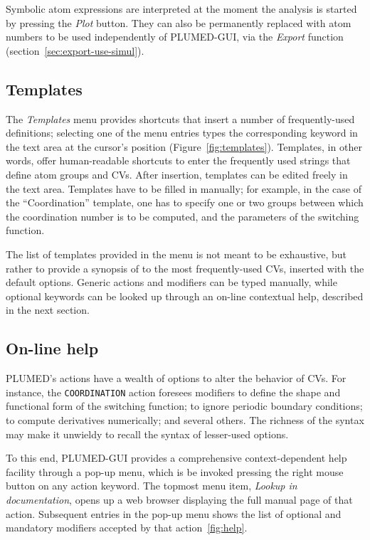 \documentclass[preprint,review,11pt]{elsarticle}
\begin{document}
Symbolic atom expressions are interpreted at the moment the analysis is
started by pressing the \emph{Plot} button. They can also be
permanently replaced with atom numbers to be used independently of PLUMED-GUI, via the
\emph{Export} function (section~\ref{sec:export-use-simul}).



\subsection{Templates}

The \emph{Templates} menu provides shortcuts that insert a number of
frequently-used definitions; selecting one of the menu entries types
the corresponding keyword in the text area at the cursor's position
(Figure~\ref{fig:templates}). Templates, in other words, offer
human-readable shortcuts to enter the frequently used strings that
define atom groups and CVs. After insertion, templates can be edited
freely in the text area.
Templates have to be filled in  manually; for example, in the
case of the ``Coordination'' template, one has to specify one or two
groups between which the coordination number is to be computed, and
the parameters of the switching function.

The list of templates provided in the menu is not meant to be
exhaustive, but rather to provide a synopsis of to the most
frequently-used CVs, inserted with the default options. Generic
actions and modifiers can be typed manually, while optional keywords
can be looked up through an on-line contextual help, described
in the next section.


\subsection{On-line help}

PLUMED's actions have a wealth of options to alter the
behavior of CVs. For instance, the \texttt{COORDINATION} action
foresees modifiers to define the shape and functional form of the
switching function; to ignore periodic boundary conditions; to compute
derivatives numerically; and several others. The richness of the
syntax may make it unwieldy to recall the syntax of lesser-used
options.


To this end, PLUMED-GUI provides a comprehensive context-dependent help facility
through a pop-up menu, which is be invoked pressing the right mouse
button on any action keyword. The topmost menu item, \emph{Lookup in
  documentation}, opens up a web browser displaying the full manual
page of that action.  Subsequent entries in the pop-up menu shows the
list of optional and mandatory modifiers accepted by that
action~\ref{fig:help}.
\end{document}
